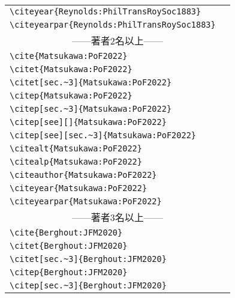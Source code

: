 \documentclass[a4paper,fleqn,uplatex,dvipdfmx]{jsarticle}
\begin{document}
\begin{table}[t]
\begin{tabular}{ll}
        \verb|\citeyear{Reynolds:PhilTransRoySoc1883}|      &\citeyear{Reynolds:PhilTransRoySoc1883} \\
        \verb|\citeyearpar{Reynolds:PhilTransRoySoc1883}|   &\citeyearpar{Reynolds:PhilTransRoySoc1883} \\
        \multicolumn{2}{c}{------著者2名以上------} \\
        \verb|\cite{Matsukawa:PoF2022}|         &\cite{Matsukawa:PoF2022} \\
        \verb|\citet{Matsukawa:PoF2022}|        &\citet{Matsukawa:PoF2022} \\
        \verb|\citet[sec.~3]{Matsukawa:PoF2022}|        &\citet[sec.~3]{Matsukawa:PoF2022} \\
        \verb|\citep{Matsukawa:PoF2022}|        &\citep{Matsukawa:PoF2022} \\
        \verb|\citep[sec.~3]{Matsukawa:PoF2022}|        &\citep[sec.~3]{Matsukawa:PoF2022} \\
        \verb|\citep[see][]{Matsukawa:PoF2022}|        &\citep[see][]{Matsukawa:PoF2022} \\
        \verb|\citep[see][sec.~3]{Matsukawa:PoF2022}|        &\citep[see][sec.~3]{Matsukawa:PoF2022} \\
        \verb|\citealt{Matsukawa:PoF2022}|      &\citealt{Matsukawa:PoF2022} \\
        \verb|\citealp{Matsukawa:PoF2022}|      &\citealp{Matsukawa:PoF2022} \\
        \verb|\citeauthor{Matsukawa:PoF2022}|   &\citeauthor{Matsukawa:PoF2022} \\
        \verb|\citeyear{Matsukawa:PoF2022}|     &\citeyear{Matsukawa:PoF2022} \\
        \verb|\citeyearpar{Matsukawa:PoF2022}|  &\citeyearpar{Matsukawa:PoF2022} \\
        \multicolumn{2}{c}{------著者3名以上------} \\
        \verb|\cite{Berghout:JFM2020}|          &\cite{Berghout:JFM2020} \\
        \verb|\citet{Berghout:JFM2020}|         &\citet{Berghout:JFM2020} \\
        \verb|\citet[sec.~3]{Berghout:JFM2020}|         &\citet[sec.~3]{Berghout:JFM2020} \\
        \verb|\citep{Berghout:JFM2020}|         &\citep{Berghout:JFM2020} \\
        \verb|\citep[sec.~3]{Berghout:JFM2020}|         &\citep[sec.~3]{Berghout:JFM2020} \\

\end{tabular}
\end{table}
\end{document}
